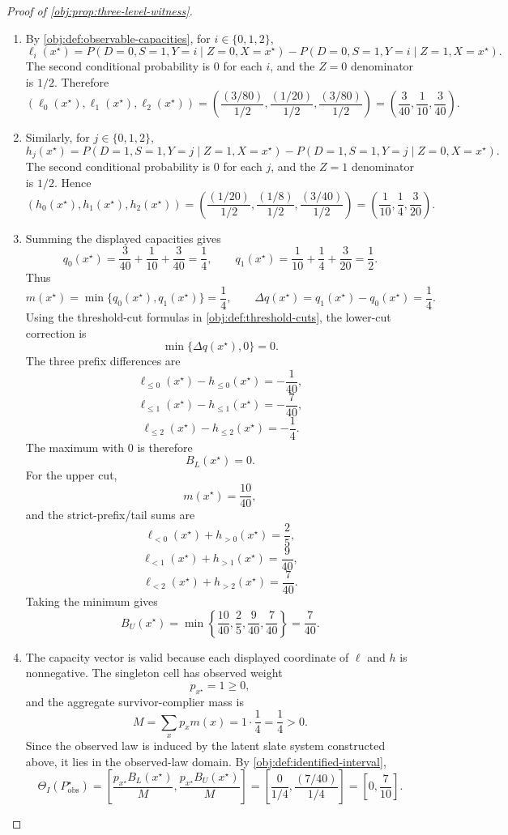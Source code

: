 \begin{proof}[Proof of \cref{obj:prop:three-level-witness}]
\begin{enumerate}
\item By \cref{obj:def:observable-capacities}, for \(i\in\{0,1,2\}\),
\[
\ell_i(x^{\star})
=
P(D=0,S=1,Y=i\mid Z=0,X=x^{\star})
-
P(D=0,S=1,Y=i\mid Z=1,X=x^{\star}).
\]
The second conditional probability is \(0\) for each \(i\), and the \(Z=0\) denominator is \(1/2\).  Therefore
\[
(\ell_0(x^{\star}),\ell_1(x^{\star}),\ell_2(x^{\star}))
=
\left(
\frac{(3/80)}{1/2},
\frac{(1/20)}{1/2},
\frac{(3/80)}{1/2}
\right)
=
\left(\frac{3}{40},\frac{1}{10},\frac{3}{40}\right).
\]

\item Similarly, for \(j\in\{0,1,2\}\),
\[
h_j(x^{\star})
=
P(D=1,S=1,Y=j\mid Z=1,X=x^{\star})
-
P(D=1,S=1,Y=j\mid Z=0,X=x^{\star}).
\]
The second conditional probability is \(0\) for each \(j\), and the \(Z=1\) denominator is \(1/2\).  Hence
\[
(h_0(x^{\star}),h_1(x^{\star}),h_2(x^{\star}))
=
\left(
\frac{(1/20)}{1/2},
\frac{(1/8)}{1/2},
\frac{(3/40)}{1/2}
\right)
=
\left(\frac{1}{10},\frac14,\frac{3}{20}\right).
\]

\item Summing the displayed capacities gives
\[
q_0(x^{\star})=\frac{3}{40}+\frac{1}{10}+\frac{3}{40}=\frac14,
\qquad
q_1(x^{\star})=\frac{1}{10}+\frac14+\frac{3}{20}=\frac12.
\]
Thus
\[
m(x^{\star})=\min\{q_0(x^{\star}),q_1(x^{\star})\}=\frac14,
\qquad
\Delta q(x^{\star})=q_1(x^{\star})-q_0(x^{\star})=\frac14 .
\]
Using the threshold-cut formulas in \cref{obj:def:threshold-cuts}, the lower-cut correction is
\[
\min\{\Delta q(x^{\star}),0\}=0.
\]
The three prefix differences are
\[
\ell_{\le0}(x^{\star})-h_{\le0}(x^{\star})=-\frac{1}{40},
\]
\[
\ell_{\le1}(x^{\star})-h_{\le1}(x^{\star})=-\frac{7}{40},
\]
\[
\ell_{\le2}(x^{\star})-h_{\le2}(x^{\star})=-\frac14 .
\]
The maximum with \(0\) is therefore
\[
B_L(x^{\star})=0.
\]
For the upper cut,
\[
m(x^{\star})=\frac{10}{40},
\]
and the strict-prefix/tail sums are
\[
\ell_{<0}(x^{\star})+h_{>0}(x^{\star})=\frac25,
\]
\[
\ell_{<1}(x^{\star})+h_{>1}(x^{\star})=\frac{9}{40},
\]
\[
\ell_{<2}(x^{\star})+h_{>2}(x^{\star})=\frac{7}{40}.
\]
Taking the minimum gives
\[
B_U(x^{\star})
=
\min\left\{\frac{10}{40},\frac25,\frac{9}{40},\frac{7}{40}\right\}
=
\frac{7}{40}.
\]

\item The capacity vector is valid because each displayed coordinate of \(\ell\) and \(h\) is nonnegative.  The singleton cell has observed weight
\[
p_{x^{\star}}=1\ge0,
\]
and the aggregate survivor-complier mass is
\[
M=\sum_x p_xm(x)=1\cdot \frac14=\frac14>0.
\]
Since the observed law is induced by the latent slate system constructed above, it lies in the observed-law domain.  By \cref{obj:def:identified-interval},
\[
\Theta_I(P_{\mathrm{obs}}^{\star})
=
\left[
\frac{p_{x^{\star}}B_L(x^{\star})}{M},
\frac{p_{x^{\star}}B_U(x^{\star})}{M}
\right]
=
\left[
\frac{0}{1/4},
\frac{(7/40)}{1/4}
\right]
=
\left[0,\frac{7}{10}\right].
\]


\end{enumerate}
\end{proof}
